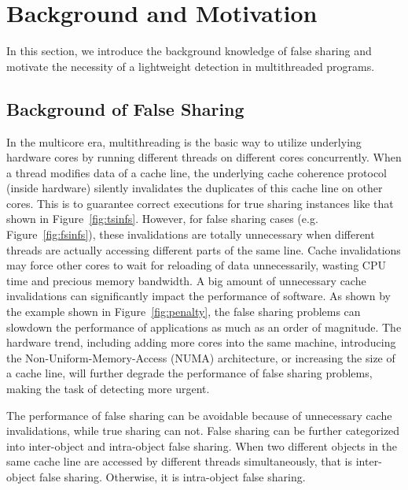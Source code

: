 \section{Background and Motivation}

\label{sec:overview}

In this section, we introduce the background knowledge of false sharing 
and motivate the necessity of a lightweight detection in multithreaded programs.

\subsection{Background of False Sharing}
\label{sec:background}

In the multicore era, multithreading is the basic way to utilize underlying hardware cores by running different threads on different cores concurrently. When a thread modifies data of a cache line, the underlying cache coherence protocol (inside hardware) silently invalidates the duplicates of this cache line on other cores. This is to guarantee correct executions for true sharing instances like that shown in Figure~\ref{fig:tsinfs}. However, for false sharing cases (e.g. Figure~\ref{fig:fsinfs}), these invalidations are totally unnecessary when different threads are actually accessing different parts of the same line. Cache invalidations may force other cores to wait for reloading of data unnecessarily, wasting CPU time and precious memory bandwidth. A big amount of unnecessary cache invalidations can significantly impact the performance of software. As shown by the example shown in Figure~\ref{fig:penalty}, the false sharing problems can slowdown the performance of applications as much as an order of magnitude. The hardware trend, including adding more cores into the same machine, introducing the Non-Uniform-Memory-Access (NUMA) architecture, or increasing the size of a cache line, will further degrade the performance of false sharing problems, making the task of detecting more urgent. 

The performance of false sharing can be avoidable because of unnecessary cache invalidations, while true sharing can not. False sharing can be further categorized into inter-object and intra-object false sharing. When two different objects in the same cache line are accessed by different threads simultaneously, that is inter-object false sharing. Otherwise, it is intra-object false sharing.  %

